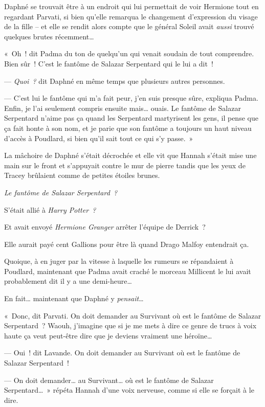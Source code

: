 Daphné se trouvait être à un endroit qui lui permettait de voir Hermione tout en regardant Parvati, si bien qu'elle remarqua le changement d'expression du visage de la fille -- et elle se rendit alors compte que le général Soleil avait \emph{aussi} trouvé quelques brutes récemment…

«~Oh~! dit Padma du ton de quelqu'un qui venait soudain de tout comprendre.
Bien sûr~!
C'est le fantôme de Salazar Serpentard qui le lui a dit~!

--- \emph{Quoi~?} dit Daphné en même temps que plusieurs autres personnes.

--- C'est lui le fantôme qui m'a fait peur, j'en suis presque sûre, expliqua Padma.
Enfin, je l'ai seulement compris ensuite mais… ouais.
Le fantôme de Salazar Serpentard n'aime pas ça quand les Serpentard martyrisent les gens, il pense que ça fait honte à son nom, et je parie que son fantôme a toujours un haut niveau d'accès à Poudlard, si bien qu'il sait tout ce qui s'y passe.~»

La mâchoire de Daphné s'était décrochée et elle vit que Hannah s'était mise une main sur le front et s'appuyait contre le mur de pierre tandis que les yeux de Tracey brûlaient comme de petites étoiles brunes.

\emph{Le fantôme de Salazar Serpentard~?}

S'était allié à \emph{Harry Potter~?}

Et avait envoyé \emph{Hermione Granger} arrêter l'équipe de Derrick~?

Elle aurait payé cent Gallions pour être là quand Drago Malfoy entendrait ça.

Quoique, à en juger par la vitesse à laquelle les rumeurs se répandaient à Poudlard, maintenant que Padma avait craché le morceau Millicent le lui avait probablement dit il y a une demi-heure…

En fait… maintenant que Daphné y \emph{pensait}…

«~Donc, dit Parvati.
On doit demander au Survivant où est le fantôme de Salazar Serpentard~?
Waouh, j'imagine que si je me mets à dire ce genre de trucs à voix haute ça veut peut-être dire que je deviens vraiment une héroïne…

--- Oui~! dit Lavande.
On doit demander au Survivant où est le fantôme de Salazar Serpentard~!

--- On doit demander… au Survivant… où est le fantôme de Salazar Serpentard…~»
répéta Hannah d'une voix nerveuse, comme si elle se forçait à le dire.

